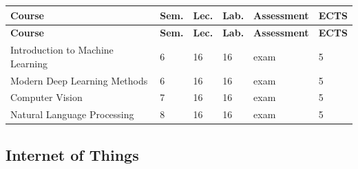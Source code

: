 \documentclass[12pt,a4paper]{article}
\newcommand{\thdrule}{\noalign{\global\setlength{\extrarowheight}{0pt}}}
\newcommand{\thdend}{\noalign{\global\setlength{\extrarowheight}{4pt}}}
\begin{document}
{\scriptsize
\begin{longtable}{m{6.5cm}m{0.7cm}m{1cm}m{1cm}m{1.7cm}m{0.7cm}}
\thdrule\toprule
\rowcolor{pjatkRed}
{\color{white}\footnotesize\textbf{\vphantom{Ag}Course}} & {\color{white}\footnotesize\textbf{\vphantom{Ag}Sem.}} & {\color{white}\footnotesize\textbf{\vphantom{Ag}Lec.}} & {\color{white}\footnotesize\textbf{\vphantom{Ag}Lab.}} & {\color{white}\footnotesize\textbf{\vphantom{Ag}Assessment}} & {\color{white}\footnotesize\textbf{\vphantom{Ag}ECTS}} \\
\midrule\thdend
\endfirsthead
\thdrule\toprule
\rowcolor{pjatkRed}
{\color{white}\footnotesize\textbf{\vphantom{Ag}Course}} & {\color{white}\footnotesize\textbf{\vphantom{Ag}Sem.}} & {\color{white}\footnotesize\textbf{\vphantom{Ag}Lec.}} & {\color{white}\footnotesize\textbf{\vphantom{Ag}Lab.}} & {\color{white}\footnotesize\textbf{\vphantom{Ag}Assessment}} & {\color{white}\footnotesize\textbf{\vphantom{Ag}ECTS}} \\
\midrule\thdend
\endhead
\rowcolor{tableRowLight} Introduction to Machine Learning & 6 & 16 & 16 & {\scriptsize exam} & 5 \\
\rowcolor{tableRowAlt} Modern Deep Learning Methods & 6 & 16 & 16 & {\scriptsize exam} & 5 \\
\rowcolor{tableRowLight} Computer Vision & 7 & 16 & 16 & {\scriptsize exam} & 5 \\
\rowcolor{tableRowAlt} Natural Language Processing & 8 & 16 & 16 & {\scriptsize exam} & 5 \\
\bottomrule
\end{longtable}}

\subsection*{Internet of Things}
\end{document}
